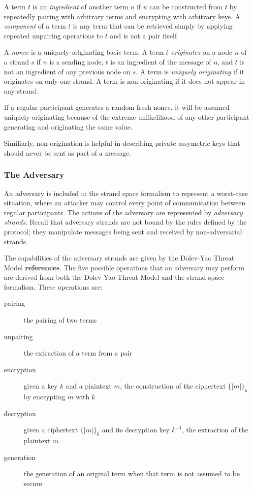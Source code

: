 			A term $t$ is an \emph{ingredient} of another term $u$ if $u$ can
			be constructed from $t$ by repeatedly pairing with arbitrary terms
			and encrypting with arbitrary keys. A \emph{component} of a term
			$t$ is any term that can be retrieved simply by applying repeated
			unpairing operations to $t$ and is not a pair itself.

			A \emph{nonce} is a uniquely-originating basic term. A term $t$
			\emph{originates} on a node $n$ of a strand $s$ if $n$ is a
			sending node, $t$ is an ingredient of the message of $n$, and
			$t$ is not an ingredient of any previous node on $s$. A term is
			\emph{uniquely originating} if it originates on only one
			strand. A term is non-originating if it does not appear in any
			strand.

			If a regular participant generates a random fresh nonce, it
			will be assumed uniquely-originating because of the extreme
			unlikelihood of any other participant generating and
			originating the same value.

			Similiarly, non-origination is helpful in describing private
			assymetric keys that should never be sent as part of a message.

		\subsubsection{The Adversary}

			An adversary is included in the strand space formalism to
			represent a worst-case situation, where an attacker may control
			every point of communication between regular participants. The
			actions of the adversary are represented by \emph{adversary
			strands}. Recall that adversary strands are not bound by the
			rules defined by the protocol; they manipulate messages being
			sent and received by non-adversarial strands.

			The capabilities of the adversary strands are given by the
			Dolev-Yao Threat Model \textbf{references}. The five possible
			operations that an adversary may perform are derived from both
			the Dolev-Yao Threat Model and the strand space formalism.
			These operations are:

			\begin{description}
			\item [pairing] the pairing of two terms
			\item [unpairing] the extraction of a term from a pair
			\item [encryption] given a key $k$ and a plaintext $m$, the construction of the ciphertext $\{|m|\}_k$ by encrypting $m$ with $k$
			\item [decryption] given a ciphertext $\{|m|\}_k$ and its decryption key $k^{-1}$, the extraction of the plaintext $m$
			\item [generation] the generation of an original term when that term is not assumed to be secure
			\end{description}

